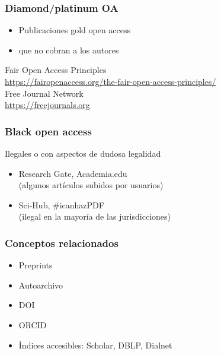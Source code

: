 \documentclass[17pt,aspectratio=169]{beamer}
\begin{document}
\begin{frame}
\frametitle{Diamond/platinum OA}

\begin{itemize}
\item Publicaciones gold open access
\item que no cobran a los autores
\end{itemize}

\begin{flushright}
  Fair Open Access Principles \\
  {\small \url{https://fairopenaccess.org/the-fair-open-access-principles/}} \\
  Free Journal Network \\
  {\small \url{https://freejournals.org}} \\
\end{flushright}
\end{frame}

\begin{frame}
\frametitle{Black open access}

Ilegales o con aspectos de dudosa legalidad

\begin{itemize}
\item Research Gate, Academia.edu \\
  (algunos artículos subidos por usuarios)
\item Sci-Hub, #icanhazPDF \\
  (ilegal en la mayoría de las jurisdicciones)
\end{itemize}

\end{frame}

\begin{frame}
\frametitle{Conceptos relacionados}

\begin{itemize}
\item Preprints
\item Autoarchivo
\item DOI
\item ORCID
\item Índices accesibles: Scholar, DBLP, Dialnet
\end{itemize}

\end{frame}
\end{document}
